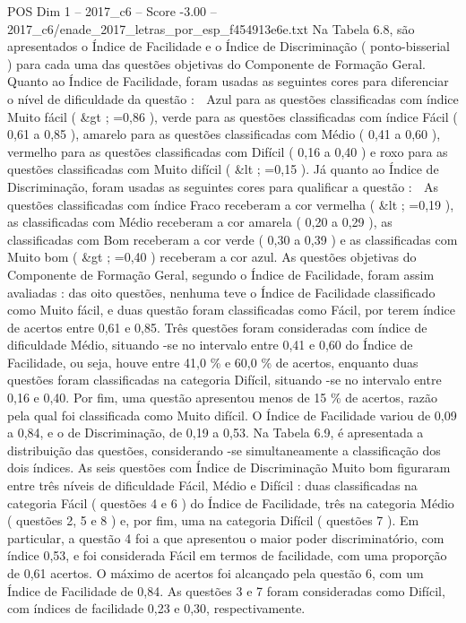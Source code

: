 \begin{textsample}{POS Dim 1 – 2017\_c6 – Score -3.00 – 2017\_c6/enade\_2017\_letras\_por\_esp\_f454913e6e.txt}
Na Tabela 6.8, são apresentados o Índice de Facilidade e o Índice de Discriminação ( ponto-bisserial ) para cada uma das questões objetivas do Componente de Formação Geral.
Quanto ao Índice de Facilidade, foram usadas as seguintes cores para diferenciar o nível de dificuldade da questão :  Azul para as questões classificadas com índice Muito fácil ( \&gt ; =0,86 ), verde para as questões classificadas com índice Fácil ( 0,61 a 0,85 ), amarelo para as questões classificadas com Médio ( 0,41 a 0,60 ), vermelho para as questões classificadas com Difícil ( 0,16 a 0,40 ) e roxo para as questões classificadas com Muito difícil ( \&lt ; =0,15 ).
Já quanto ao Índice de Discriminação, foram usadas as seguintes cores para qualificar a questão :  As questões classificadas com índice Fraco receberam a cor vermelha ( \&lt ; =0,19 ), as classificadas com Médio receberam a cor amarela ( 0,20 a 0,29 ), as classificadas com Bom receberam a cor verde ( 0,30 a 0,39 ) e as classificadas com Muito bom ( \&gt ; =0,40 ) receberam a cor azul.
As questões objetivas do Componente de Formação Geral, segundo o Índice de Facilidade, foram assim avaliadas : das oito questões, nenhuma teve o Índice de Facilidade classificado como Muito fácil, e duas questão foram classificadas como Fácil, por terem índice de acertos entre 0,61 e 0,85.
Três questões foram consideradas com índice de dificuldade Médio, situando -se no intervalo entre 0,41 e 0,60 do Índice de Facilidade, ou seja, houve entre 41,0 \% e 60,0 \% de acertos, enquanto duas questões foram classificadas na categoria Difícil, situando -se no intervalo entre 0,16 e 0,40.
Por fim, uma questão apresentou menos de 15 \% de acertos, razão pela qual foi classificada como Muito difícil.
O Índice de Facilidade variou de 0,09 a 0,84, e o de Discriminação, de 0,19 a 0,53.
Na Tabela 6.9, é apresentada a distribuição das questões, considerando -se simultaneamente a classificação dos dois índices.
As seis questões com Índice de Discriminação Muito bom figuraram entre três níveis de dificuldade Fácil, Médio e Difícil : duas classificadas na categoria Fácil ( questões 4 e 6 ) do Índice de Facilidade, três na categoria Médio ( questões 2, 5 e 8 ) e, por fim, uma na categoria Difícil ( questões 7 ).
Em particular, a questão 4 foi a que apresentou o maior poder discriminatório, com índice 0,53, e foi considerada Fácil em termos de facilidade, com uma proporção de 0,61 acertos.
O máximo de acertos foi alcançado pela questão 6, com um Índice de Facilidade de 0,84.
As questões 3 e 7 foram consideradas como Difícil, com índices de facilidade 0,23 e 0,30, respectivamente.

\end{textsample}
